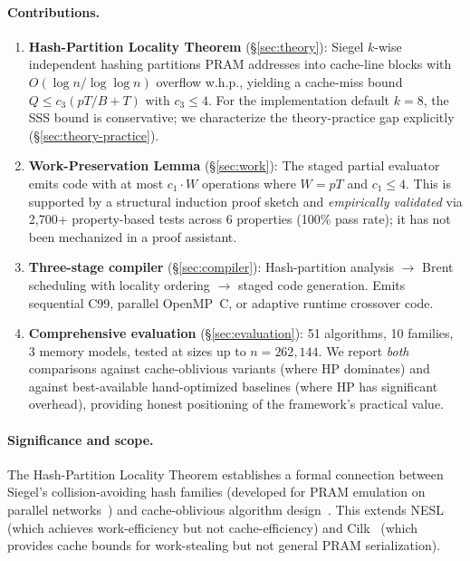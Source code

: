\documentclass[11pt]{article}
\begin{document}
\paragraph{Contributions.}
\begin{enumerate}[leftmargin=*]
\item \textbf{Hash-Partition Locality Theorem}
  (\S\ref{sec:theory}): Siegel $k$-wise independent hashing partitions
  PRAM addresses into cache-line blocks with $O(\log n / \log\log n)$
  overflow w.h.p., yielding a cache-miss bound $Q \le c_3(pT/B + T)$
  with $c_3 \le 4$.  For the implementation default $k = 8$, the SSS
  bound is conservative; we characterize the theory-practice gap
  explicitly (\S\ref{sec:theory-practice}).

\item \textbf{Work-Preservation Lemma} (\S\ref{sec:work}): The
  staged partial evaluator emits code with at most $c_1 \cdot W$
  operations where $W = pT$ and $c_1 \le 4$.  This is supported by a
  structural induction proof sketch and \emph{empirically validated}
  via 2,700+ property-based tests across 6 properties (100\% pass
  rate); it has not been mechanized in a proof assistant.

\item \textbf{Three-stage compiler} (\S\ref{sec:compiler}):
  Hash-partition analysis $\to$ Brent scheduling with locality
  ordering $\to$ staged code generation.  Emits sequential C99,
  parallel OpenMP~C, or adaptive runtime crossover code.

\item \textbf{Comprehensive evaluation} (\S\ref{sec:evaluation}):
  51 algorithms, 10 families, 3 memory models, tested at sizes up to
  $n = 262{,}144$.  We report \emph{both} comparisons against
  cache-oblivious variants (where HP dominates) and against
  best-available hand-optimized baselines (where HP has significant
  overhead), providing honest positioning of the framework's
  practical value.
\end{enumerate}

\paragraph{Significance and scope.}
The Hash-Partition Locality Theorem establishes a formal connection
between Siegel's collision-avoiding hash families (developed for PRAM
emulation on parallel networks~\cite{siegel2004universal}) and
cache-oblivious algorithm design~\cite{frigo1999cache}.  This extends
NESL~\cite{blelloch1996programming} (which achieves work-efficiency but
not cache-efficiency) and Cilk~\cite{frigo1998implementation} (which
provides cache bounds for work-stealing but not general PRAM
serialization).
\end{document}
